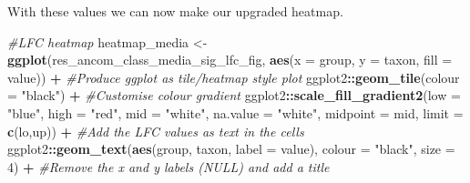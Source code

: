 \documentclass[
]{book}
\newenvironment{Shaded}{\begin{snugshade}}{\end{snugshade}}
\newcommand{\AttributeTok}[1]{\textcolor[rgb]{0.13,0.29,0.53}{#1}}
\newcommand{\CommentTok}[1]{\textcolor[rgb]{0.56,0.35,0.01}{\textit{#1}}}
\newcommand{\DecValTok}[1]{\textcolor[rgb]{0.00,0.00,0.81}{#1}}
\newcommand{\FunctionTok}[1]{\textcolor[rgb]{0.13,0.29,0.53}{\textbf{#1}}}
\newcommand{\NormalTok}[1]{#1}
\newcommand{\OtherTok}[1]{\textcolor[rgb]{0.56,0.35,0.01}{#1}}
\newcommand{\SpecialCharTok}[1]{\textcolor[rgb]{0.81,0.36,0.00}{\textbf{#1}}}
\newcommand{\StringTok}[1]{\textcolor[rgb]{0.31,0.60,0.02}{#1}}
\begin{document}
\begin{Shaded}
\end{Shaded}

With these values we can now make our upgraded heatmap.

\begin{Shaded}
\begin{Highlighting}[]
\CommentTok{\#LFC heatmap}
\NormalTok{heatmap\_media }\OtherTok{\textless{}{-}} \FunctionTok{ggplot}\NormalTok{(res\_ancom\_class\_media\_sig\_lfc\_fig,}
                        \FunctionTok{aes}\NormalTok{(}\AttributeTok{x =}\NormalTok{ group, }\AttributeTok{y =}\NormalTok{ taxon, }\AttributeTok{fill =}\NormalTok{ value)) }\SpecialCharTok{+}
                  \CommentTok{\#Produce ggplot as tile/heatmap style plot}
\NormalTok{                  ggplot2}\SpecialCharTok{::}\FunctionTok{geom\_tile}\NormalTok{(}\AttributeTok{colour =} \StringTok{"black"}\NormalTok{) }\SpecialCharTok{+}
                  \CommentTok{\#Customise colour gradient}
\NormalTok{                  ggplot2}\SpecialCharTok{::}\FunctionTok{scale\_fill\_gradient2}\NormalTok{(}\AttributeTok{low =} \StringTok{"blue"}\NormalTok{, }\AttributeTok{high =} \StringTok{"red"}\NormalTok{, }\AttributeTok{mid =} \StringTok{"white"}\NormalTok{,}
                                                \AttributeTok{na.value =} \StringTok{"white"}\NormalTok{,}
                                                \AttributeTok{midpoint =}\NormalTok{ mid, }\AttributeTok{limit =} \FunctionTok{c}\NormalTok{(lo,up)) }\SpecialCharTok{+}
                  \CommentTok{\#Add the LFC values as text in the cells}
\NormalTok{                  ggplot2}\SpecialCharTok{::}\FunctionTok{geom\_text}\NormalTok{(}\FunctionTok{aes}\NormalTok{(group, taxon, }\AttributeTok{label =}\NormalTok{ value),}
                      \AttributeTok{colour =} \StringTok{"black"}\NormalTok{, }\AttributeTok{size =} \DecValTok{4}\NormalTok{) }\SpecialCharTok{+}
                  \CommentTok{\#Remove the x and y labels (NULL) and add a title}

\end{Highlighting}
\end{Shaded}
\end{document}
